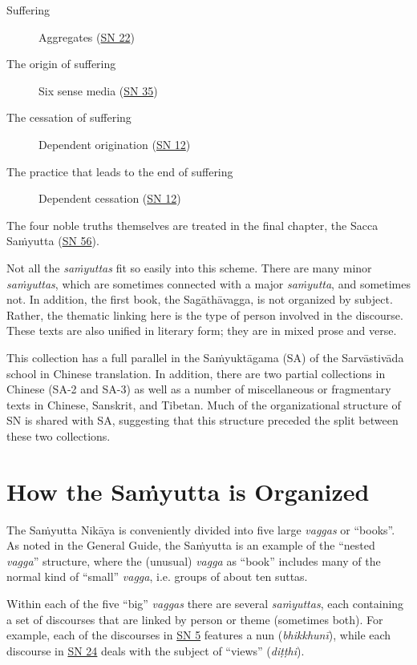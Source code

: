 \documentclass[12pt,openany]{book}%
\begin{document}
\begin{description}%
\item[Suffering] Aggregates (\href{https://suttacentral.net/sn22}{SN 22})%
\item[The origin of suffering] Six sense media (\href{https://suttacentral.net/sn35}{SN 35})%
\item[The cessation of suffering] Dependent origination (\href{https://suttacentral.net/sn12}{SN 12})%
\item[The practice that leads to the end of suffering] Dependent cessation (\href{https://suttacentral.net/sn12}{SN 12})%
\end{description}

The four noble truths themselves are treated in the final chapter, the Sacca \textsanskrit{Saṁyutta} (\href{https://suttacentral.net/sn56}{SN 56}).

Not all the \textit{\textsanskrit{saṁyuttas}} fit so easily into this scheme. There are many minor \textit{\textsanskrit{saṁyuttas}}, which are sometimes connected with a major \textit{\textsanskrit{saṁyutta}}, and sometimes not. In addition, the first book, the \textsanskrit{Sagāthāvagga}, is not organized by subject. Rather, the thematic linking here is the type of person involved in the discourse. These texts are also unified in literary form; they are in mixed prose and verse.

This collection has a full parallel in the \textsanskrit{Saṁyuktāgama} (SA) of the \textsanskrit{Sarvāstivāda} school in Chinese translation. In addition, there are two partial collections in Chinese (SA-2 and SA-3) as well as a number of miscellaneous or fragmentary texts in Chinese, Sanskrit, and Tibetan. Much of the organizational structure of SN is shared with SA, suggesting that this structure preceded the split between these two collections.

\section*{How the \textsanskrit{Saṁyutta} is Organized}

The \textsanskrit{Saṁyutta} \textsanskrit{Nikāya} is conveniently divided into five large \textit{vaggas} or “books”. As noted in the General Guide, the \textsanskrit{Saṁyutta} is an example of the “nested \textit{vagga}” structure, where the (unusual) \textit{vagga} as “book” includes many of the normal kind of “small” \textit{vagga}, i.e. groups of about ten suttas.

Within each of the five “big” \textit{vaggas} there are several \textit{\textsanskrit{saṁyuttas}}, each containing a set of discourses that are linked by person or theme (sometimes both). For example, each of the discourses in \href{https://suttacentral.net/sn5}{SN 5} features a nun (\textit{\textsanskrit{bhikkhunī}}), while each discourse in \href{https://suttacentral.net/sn24}{SN 24} deals with the subject of “views” (\textit{\textsanskrit{diṭṭhi}}).
\end{document}
